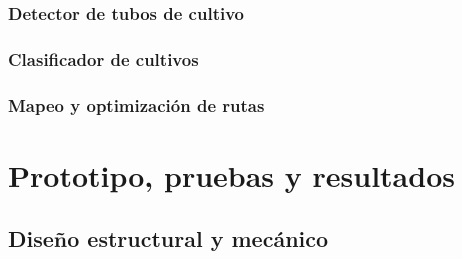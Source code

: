 \documentclass[a4paper,12pt]{report}
\begin{document}
\subsection{Detector de tubos de cultivo}




\subsection{Clasificador de cultivos}



\subsection{Mapeo y optimización de rutas}



%
%
%
%

\chapter{Prototipo, pruebas y resultados}
\section{Diseño estructural y mecánico}





%
%

%
%
\end{document}

